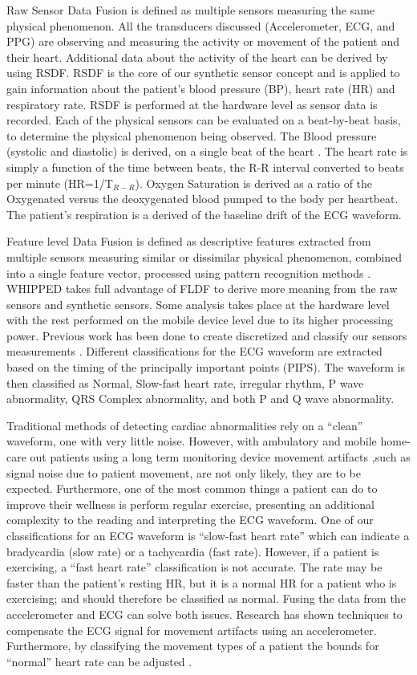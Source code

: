 Raw Sensor Data Fusion is defined as multiple sensors measuring the same physical phenomenon. All the transducers discussed (Accelerometer, ECG, and PPG) are observing and measuring the activity or movement of the patient and their heart. Additional data about the activity of the heart can be derived by using RSDF. RSDF is the core of our synthetic sensor concept and is applied to gain information about the patient's blood pressure (BP), heart rate (HR) and respiratory rate. RSDF is performed at the hardware level as sensor data is recorded. Each of the physical sensors can be evaluated on a beat-by-beat basis, to determine the physical phenomenon being observed. The Blood pressure (systolic and diastolic) is derived, on a single beat of the heart \cite{Poon2005}. The heart rate is simply a function of the time between beats, the R-R interval converted to beats per minute (HR=1/T$_{R-R}$). Oxygen Saturation is derived as a ratio of the Oxygenated versus the deoxygenated blood pumped to the body per heartbeat. The patient's respiration is a derived of the baseline drift of the ECG waveform. 

Feature level Data Fusion is defined as descriptive features extracted from multiple sensors measuring similar or dissimilar physical phenomenon, combined into a single feature vector,  processed using pattern recognition methods \cite{DaSilva2012}. WHIPPED takes full advantage of FLDF to derive more meaning from the raw sensors and synthetic sensors. Some analysis takes place at the hardware level with the rest performed on the mobile device level due to its higher processing power. Previous work has been done to create discretized and classify our sensors measurements \cite{Chaiyasucheeva2012} \cite{DaSilva2012}. Different classifications for the ECG waveform are extracted based on the timing of the principally important points (PIPS).  The waveform is then classified as Normal, Slow-fast heart rate, irregular rhythm, P wave abnormality, QRS Complex abnormality, and both P and Q wave abnormality. 

Traditional methods of detecting cardiac abnormalities rely on a “clean” waveform, one with very little noise. However, with ambulatory and mobile home-care out patients using a long term monitoring device movement artifacts ,such as signal noise due to patient movement, are not only likely, they are to be expected. Furthermore, one of the most common things a patient can do to improve their wellness is perform regular exercise, presenting an additional complexity to the reading and interpreting the ECG waveform. One of our classifications for an ECG waveform is “slow-fast heart rate” which can indicate a bradycardia (slow rate) or a tachycardia (fast rate). However, if a patient is exercising, a “fast heart rate” classification is not accurate. The rate may be faster than the patient's resting HR, but it is a normal HR for a patient who is exercising; and should therefore be classified as normal. Fusing the data from the accelerometer and ECG can solve both issues. Research has shown techniques to compensate the ECG signal for movement artifacts using an accelerometer. Furthermore, by classifying the movement types of a patient the bounds for “normal” heart rate can be adjusted \cite{Shannon2012}.

